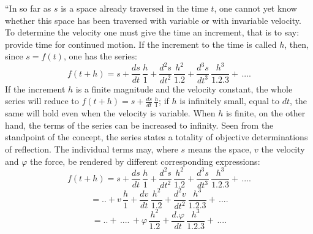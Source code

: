 \documentclass[12pt,a4paper]{book}
\begin{document}
``In so far as $s$ is a space already traversed in the time $t$, one cannot yet
know whether this space has been traversed with variable or with invariable
velocity. To determine the velocity one must give the time an increment, that
is to say: provide time for continued motion. If the increment to the time is
called $h$, then, since $s = f(t)$, one has the series:
\[ f(t + h) = s + \frac{ds}{dt}\,\frac{h}{1} +
\frac{d^{2}s}{dt^{2}}\,\frac{h^{2}}{1.2} +
\frac{d^{3}s}{dt^{3}}\,\frac{h^{3}}{1.2.3} +\,.... \]
If the increment $h$ is a finite magnitude and the velocity constant, the whole
series will reduce to $f(t + h) = s + \frac{ds}{dt}\, \frac{h}{1}$; if $h$ is
infinitely small, equal to $dt$, the same will hold even when the velocity is
variable. When $h$ is finite, on the other hand, the terms of the series can be
increased to infinity. Seen from the standpoint of the concept, the series
states a totality of objective determinations of reflection. The individual
terms may, where $s$ means the space, $v$ the velocity and $\varphi$ the force,
be rendered by different corresponding expressions:
\[ f(t + h) = s + \frac{ds}{dt}\,\frac{h}{1} +
\frac{d^{2}s}{dt^{2}}\,\frac{h^{2}}{1.2} +
\frac{d^{3}s}{dt^{3}}\,\frac{h^{3}}{1.2.3} +\,.... \]
\[ = .. + v\,\frac{h}{1} + \frac{dv}{dt}\,\frac{h^{2}}{1.2} +
\frac{d^{2}v}{dt^{2}}\,\frac{h^{3}}{1.2.3} +\,.... \]
\[ = .. +\,....\,+ \varphi\,\frac{h^{2}}{1.2} +
\frac{d.\varphi}{dt}\,\frac{h^{3}}{1.2.3} +\,.... \]
\setcounter{footnote}{0}
\end{document}
